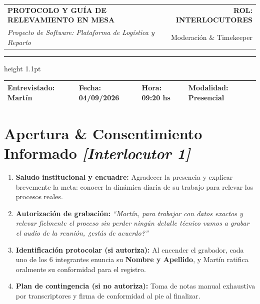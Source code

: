 \documentclass[11pt,a4paper]{article}
\begin{document}
\noindent
\begin{tabularx}{\textwidth}{@{}X r@{}}
  \textbf{\large PROTOCOLO Y GUÍA DE RELEVAMIENTO EN MESA} & \textbf{\normalsize ROL: INTERLOCUTORES} \\
  \textit{Proyecto de Software: Plataforma de Logística y Reparto} & \small Moderación \& Timekeeper \\
\end{tabularx}
\vspace{1pt}
\hrule height 1.1pt
\vspace{4pt}

\noindent
\begin{tabularx}{\textwidth}{|X|X|X|X|}
\hline
\rowcolor{grisCabecera}
\textbf{Entrevistado:} Martín & \textbf{Fecha:} 04/09/2026 & \textbf{Hora:} 09:20 hs & \textbf{Modalidad:} Presencial \\
\hline
\end{tabularx}

\vspace{5pt}

\section*{Apertura \& Consentimiento Informado \hfill \normalfont\small\itshape [Interlocutor 1]}
\begin{enumerate}[label=\textbf{\alph*.}]
  \item \textbf{Saludo institucional y encuadre:} Agradecer la presencia y explicar brevemente la meta: conocer la dinámica diaria de su trabajo para relevar los procesos reales.
  \item \textbf{Autorización de grabación:} 
  \textit{``Martín, para trabajar con datos exactos y relevar fielmente el proceso sin perder ningún detalle técnico vamos a grabar el audio de la reunión, ¿estás de acuerdo?''}
  \item \textbf{Identificación protocolar (si autoriza):} Al encender el grabador, cada uno de los 6 integrantes enuncia su \textbf{Nombre y Apellido}, y Martín ratifica oralmente su conformidad para el registro.
  \item \textbf{Plan de contingencia (si no autoriza):} Toma de notas manual exhaustiva por transcriptores y firma de conformidad al pie al finalizar.
\end{enumerate}

\end{document}
